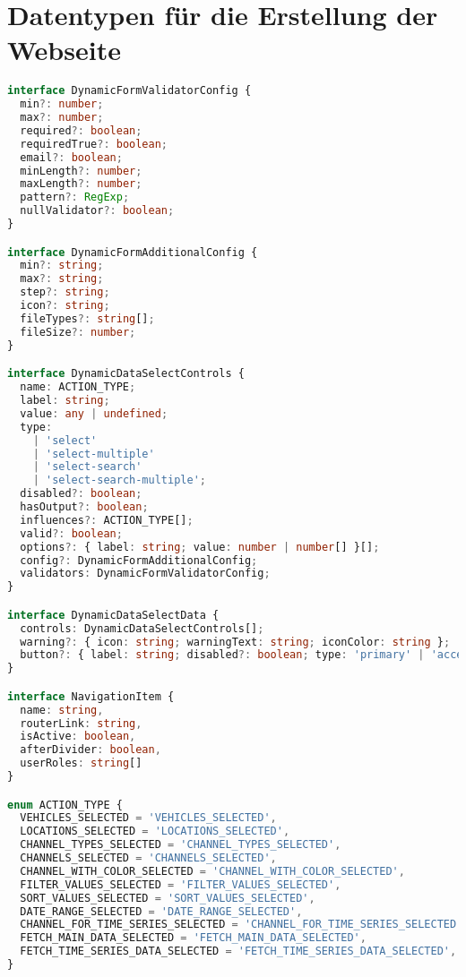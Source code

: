 \section{Datentypen für die Erstellung der Webseite}
\label{appendix:dataset_types}
\begin{lstlisting}[language=Typescript]
interface DynamicFormValidatorConfig {
  min?: number;
  max?: number;
  required?: boolean;
  requiredTrue?: boolean;
  email?: boolean;
  minLength?: number;
  maxLength?: number;
  pattern?: RegExp;
  nullValidator?: boolean;
}

interface DynamicFormAdditionalConfig {
  min?: string;
  max?: string;
  step?: string;
  icon?: string;
  fileTypes?: string[];
  fileSize?: number;
}

interface DynamicDataSelectControls {
  name: ACTION_TYPE;
  label: string;
  value: any | undefined;
  type:
    | 'select'
    | 'select-multiple'
    | 'select-search'
    | 'select-search-multiple';
  disabled?: boolean;
  hasOutput?: boolean;
  influences?: ACTION_TYPE[];
  valid?: boolean;
  options?: { label: string; value: number | number[] }[];
  config?: DynamicFormAdditionalConfig;
  validators: DynamicFormValidatorConfig;
}

interface DynamicDataSelectData {
  controls: DynamicDataSelectControls[];
  warning?: { icon: string; warningText: string; iconColor: string };
  button?: { label: string; disabled?: boolean; type: 'primary' | 'accent' };
}

interface NavigationItem {
  name: string,
  routerLink: string,
  isActive: boolean,
  afterDivider: boolean,
  userRoles: string[]
}

enum ACTION_TYPE {
  VEHICLES_SELECTED = 'VEHICLES_SELECTED',
  LOCATIONS_SELECTED = 'LOCATIONS_SELECTED',
  CHANNEL_TYPES_SELECTED = 'CHANNEL_TYPES_SELECTED',
  CHANNELS_SELECTED = 'CHANNELS_SELECTED',
  CHANNEL_WITH_COLOR_SELECTED = 'CHANNEL_WITH_COLOR_SELECTED',
  FILTER_VALUES_SELECTED = 'FILTER_VALUES_SELECTED',
  SORT_VALUES_SELECTED = 'SORT_VALUES_SELECTED',
  DATE_RANGE_SELECTED = 'DATE_RANGE_SELECTED',
  CHANNEL_FOR_TIME_SERIES_SELECTED = 'CHANNEL_FOR_TIME_SERIES_SELECTED',
  FETCH_MAIN_DATA_SELECTED = 'FETCH_MAIN_DATA_SELECTED',
  FETCH_TIME_SERIES_DATA_SELECTED = 'FETCH_TIME_SERIES_DATA_SELECTED',
}
\end{lstlisting}
